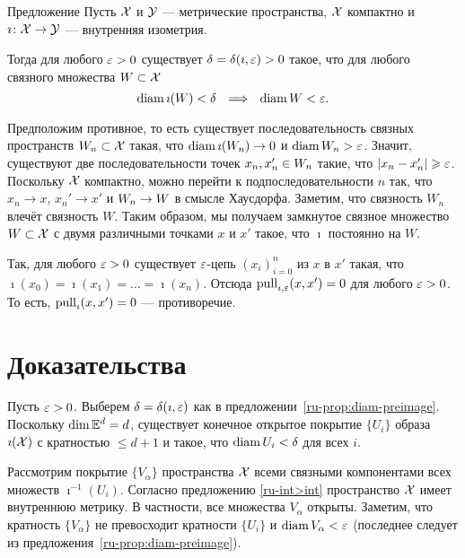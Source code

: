 \documentclass[oneside,a4paper]{article}
\begin{document}
\begin{thm}{Предложение}\label{ru-prop:diam-preimage} 
Пусть $\mathcal{X}$ и $\mathcal{Y}$ --- метрические пространства, 
$\mathcal{X}$ компактно и $\imath\colon\mathcal{X}\to \mathcal{Y}$ --- внутренняя изометрия.

Тогда для любого $\varepsilon>0$ существует $\delta=\delta(\imath,\varepsilon)>0$ такое, что для любого связного множества $W\subset \mathcal{X}$  
$$\diam \imath(W)<\delta\ \ \Longrightarrow\ \ \diam W<\eps.$$ 

\end{thm}

Предположим противное, то есть существует последовательность связных пространств $W_n\subset \mathcal{X}$ такая, что $\mathop{\rm diam}\nolimits \imath(W_n)\to 0$ и $\mathop{\rm diam}\nolimits W_n>\varepsilon$.
Значит, существуют две последовательности точек $x_n,x_n'\z\in W_n$ такие, что $|x_n -x_n'|\geqslant\varepsilon$. 
Поскольку $\mathcal{X}$ компактно,
можно перейти к подпоследовательности $n$ так, что $x_n\to x$, $x_n'\to x'$ и $W_n\z\to W$ в смысле Хаусдорфа.
Заметим, что связность $W_n$ влечёт связность $W$.
Таким образом, мы получаем замкнутое связное множество $W\subset \mathcal{X}$ с двумя различными точками $x$ и $x'$ такое, что $\imath$ постоянно на $W$. 

Так, для любого $\varepsilon>0$ существует $\varepsilon$-цепь $(x_i)_{i=0}^n$ из $x$ в $x'$ такая, что $\imath(x_0)=\imath(x_1)=\dots=\imath(x_n)$.
Отсюда $\mathop{\rm pull}\nolimits_{\imath,\varepsilon}(x,x')=0$ для любого $\varepsilon>0$.
То есть, $\mathop{\rm pull}\nolimits_{\imath}(x,x')=0$ --- противоречие.
\qeds










\section{Доказательства}
\label{ru-proofs}

Пусть $\varepsilon>0$.
Выберем $\delta\z=\delta(\imath,\eps)$ как в предложении~\ref{ru-prop:diam-preimage}. 
Поскольку $\mathop{\rm dim}\nolimits \mathbb{E}^d=d$, существует конечное открытое покрытие $\{U_i\}$ образа $\imath(\mathcal{X})$ с кратностью $\le d+1$ и
такое, что $\mathop{\rm diam}\nolimits U_i<\delta$ для всех $i$.

Рассмотрим покрытие $\{V_\alpha\}$ пространства $\mathcal{X}$ всеми связными компонентами всех множеств $\imath^{-1}(U_i)$.
Согласно предложению \ref{ru-int>int} пространство $\mathcal{X}$ имеет внутреннюю метрику.
В частности,
все множества $V_\alpha$ открыты.
Заметим, что кратность $\{V_\alpha\}$ не превосходит кратности $\{U_i\}$ 
и $\mathop{\rm diam}\nolimits V_\alpha<\varepsilon$ (последнее следует из предложения~\ref{ru-prop:diam-preimage}).
\qeds
\end{document}
